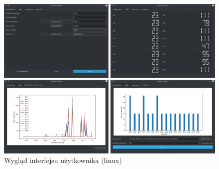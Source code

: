 \documentclass[a4paper,12pt]{article}
\begin{document}
\begin{figure}
        \begin{multicols}{2}
        
        \includegraphics[width=0.49\textwidth]{configuration.png}\par
        
        
        \includegraphics[width=0.49\textwidth]{digits.png}\par
        
        
        \end{multicols}\hfill
        
        \begin{multicols}{2}
        
        
        \includegraphics[width=0.49\textwidth]{wizualization.png}\par
        
        
        \includegraphics[width=0.49\textwidth]{wiz_ss.png}\par
        
        \end{multicols}
        \caption{Wygląd interfejsu użytkownika (linux)}
        \label{Gui pic}
        \end{figure}
\end{document}
